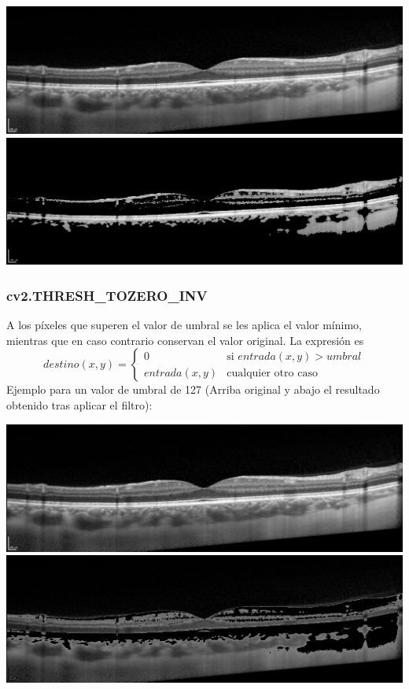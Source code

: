 \includegraphics[scale=0.40]{imagenes/EjemploTecnicasThresholdOriginal.png}\\
\includegraphics[scale=0.40]{imagenes/EjemploTecnicasThresholdTo0_127.png}


\subsubsection{cv2.THRESH\_TOZERO\_INV}
A los píxeles que superen el valor de umbral se les aplica el valor
mínimo, mientras que en caso contrario conservan el valor original. La
expresión es
\begin{equation*}
  destino(x, y) =
  \begin{cases}
    0  & \text{si } entrada(x, y) > umbral \\
    entrada(x, y) & \text{cualquier otro caso}
  \end{cases}
\end{equation*}
Ejemplo para un valor de umbral de 127 (Arriba original y abajo el
resultado obtenido tras aplicar el filtro):

\includegraphics[scale=0.40]{imagenes/EjemploTecnicasThresholdOriginal.png}\\
\includegraphics[scale=0.40]{imagenes/EjemploTecnicasThresholdTo0Inv_127.png}

